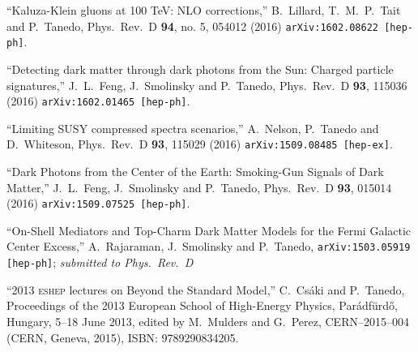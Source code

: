 \documentclass[margin,line]{resume}
\newcommand{\scap}[1]{\textsc{\MakeLowercase{#1}}}
\begin{document}
\begin{resume}
  ``Kaluza-Klein gluons at 100 TeV: NLO corrections,''
  B.~Lillard, T.~M.~P.~Tait and P.~Tanedo,
  Phys.\ Rev.\ D {\bf 94}, no. 5, 054012 (2016)
  \texttt{arXiv:1602.08622 [hep-ph]}.
  \vspace{-2mm}

  ``Detecting dark matter through dark photons from the Sun: Charged particle signatures,''
  J.~L.~Feng, J.~Smolinsky and P.~Tanedo,
  Phys.\ Rev.\ D {\bf 93}, 115036 (2016)
  \texttt{arXiv:1602.01465 [hep-ph]}.
  \vspace{-2mm}

  ``Limiting SUSY compressed spectra scenarios,''
    A.~Nelson, P.~Tanedo and D.~Whiteson,
   Phys.\ Rev.\ D {\bf 93}, 115029 (2016)
  \texttt{arXiv:1509.08485 [hep-ex]}.
\vspace{-2mm}


  ``Dark Photons from the Center of the Earth: Smoking-Gun Signals of Dark Matter,''
  J.~L.~Feng, J.~Smolinsky and P.~Tanedo,
  Phys.\ Rev.\ D {\bf 93}, 015014 (2016)
  \texttt{arXiv:1509.07525 [hep-ph]}.

\vspace{-2mm}


``On-Shell Mediators and Top-Charm Dark Matter Models for the Fermi Galactic Center Excess,''
  A.~Rajaraman, J.~Smolinsky and P.~Tanedo,
\texttt{arXiv:1503.05919 [hep-ph]}; \emph{submitted to Phys.~Rev.~D}

\vspace{-2mm}


``2013 \scap{ESHEP} lectures on Beyond the Standard Model,''
  C.~Cs\'aki and P.~Tanedo, %
Proceedings of the 2013 European School of High-Energy Physics, Par\'{a}df\"{u}rd\H{o}, Hungary, 5--18 June 2013, edited by M.~Mulders and G.~Perez, CERN--2015--004 (CERN, Geneva, 2015), ISBN: 9789290834205.


\vspace{-2mm}



\end{resume}
\end{document}
